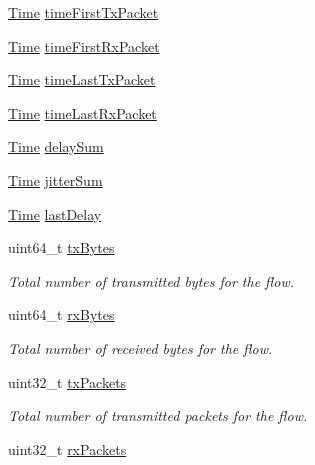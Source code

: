 \begin{DoxyCompactItemize}
\item 
\hyperlink{classns3_1_1Time}{Time} \hyperlink{structns3_1_1FlowMonitor_1_1FlowStats_af3ce626d34564326c630e0f85bf8e060}{time\+First\+Tx\+Packet}
\item 
\hyperlink{classns3_1_1Time}{Time} \hyperlink{structns3_1_1FlowMonitor_1_1FlowStats_ac67159b5cc3efc9cb59f48293d9db61c}{time\+First\+Rx\+Packet}
\item 
\hyperlink{classns3_1_1Time}{Time} \hyperlink{structns3_1_1FlowMonitor_1_1FlowStats_a2f88b832899d8d486204e59da1b5db94}{time\+Last\+Tx\+Packet}
\item 
\hyperlink{classns3_1_1Time}{Time} \hyperlink{structns3_1_1FlowMonitor_1_1FlowStats_a96fdd2ad422c4428fe058b905f4e11dd}{time\+Last\+Rx\+Packet}
\item 
\hyperlink{classns3_1_1Time}{Time} \hyperlink{structns3_1_1FlowMonitor_1_1FlowStats_ab1bf26cc10f8a0bb4a549d4d47188d15}{delay\+Sum}
\item 
\hyperlink{classns3_1_1Time}{Time} \hyperlink{structns3_1_1FlowMonitor_1_1FlowStats_ae9624614aa39fc4c53dbbf6f8030040c}{jitter\+Sum}
\item 
\hyperlink{classns3_1_1Time}{Time} \hyperlink{structns3_1_1FlowMonitor_1_1FlowStats_a93ebfac09aec55697e4269ce228b8237}{last\+Delay}
\item 
uint64\+\_\+t \hyperlink{structns3_1_1FlowMonitor_1_1FlowStats_ad2cfc997073dcd4a723b54c26e4ca2c8}{tx\+Bytes}
\begin{DoxyCompactList}\small\item\em Total number of transmitted bytes for the flow. \end{DoxyCompactList}\item 
uint64\+\_\+t \hyperlink{structns3_1_1FlowMonitor_1_1FlowStats_a9da466d3f73f946521be4a0964c403ad}{rx\+Bytes}
\begin{DoxyCompactList}\small\item\em Total number of received bytes for the flow. \end{DoxyCompactList}\item 
uint32\+\_\+t \hyperlink{structns3_1_1FlowMonitor_1_1FlowStats_ad2692665c1bb2e79be11bf704c3cc2be}{tx\+Packets}
\begin{DoxyCompactList}\small\item\em Total number of transmitted packets for the flow. \end{DoxyCompactList}\item 
uint32\+\_\+t \hyperlink{structns3_1_1FlowMonitor_1_1FlowStats_a175aa3e372c0e265a7f75f68e5316ee0}{rx\+Packets}

\end{DoxyCompactItemize}
